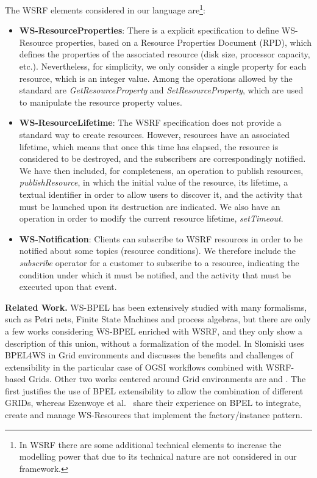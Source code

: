 The WSRF elements considered in our language are\footnote{In WSRF there are some additional technical elements to 
increase the modelling
power that due to its technical nature
are not considered in our framework.}:

\begin{itemize}
\item {\bf WS-ResourceProperties}: There is a explicit specification 
to define WS-Resource properties, based on 
a Resource Properties Document (RPD),  which
defines the properties of the associated resource
(disk size, processor capacity, etc.).
Nevertheless, for simplicity, we only consider a single property
for each resource, which is an integer value.
Among the operations allowed by the standard are \linebreak
\emph{GetResourceProperty} 
and \emph{SetResourceProperty}, which are used to manipulate 
the resource property values.
%
%
%
\item {\bf WS-ResourceLifetime}: The WSRF specification does not 
provide a standard way to create resources. However,
resources have an associated lifetime, which means that once
this time has elapsed, the resource is considered to be destroyed,
and the subscribers are correspondingly notified.
%
We have then included, for completeness, an operation to publish
resources, {\em publishResource}, in which the initial value
of the resource, its lifetime, a textual identifier in order to allow
users to discover it, and the activity that must
be launched upon its destruction are indicated. We also have
an operation in order to modify the current resource lifetime,
{\em setTimeout}. 

\item {\bf WS-Notification}: Clients can subscribe to WSRF
resources in order to be notified about some topics (resource
conditions). We therefore include the {\em subscribe} operator 
for a customer to subscribe to a resource, indicating the
condition under which it must be notified, and the activity that
must be executed 
upon that event.


\end{itemize}

{\bf Related Work.} WS-BPEL has been extensively studied with many formalisms, such as
Petri nets, Finite State Machines and process algebras, but
there are only a few works considering WS-BPEL enriched with
WSRF, and they only show a description of this union,
without a formalization of the model.
In \cite{Slomiski:2006} Slomiski uses BPEL4WS in Grid environments and discusses the
benefits and challenges of extensibility in the particular case of OGSI workflows
combined with WSRF-based Grids. Other two works centered around Grid environments are
\cite{Leymann:2006} and \cite{Ezenwoye:2007}. The first justifies
the use of BPEL extensibility to allow the combination of different GRIDs, whereas
Ezenwoye et al.~\cite{Ezenwoye:2007} share their experience on BPEL to integrate,
create and manage WS-Resources that implement the factory/instance pattern.


